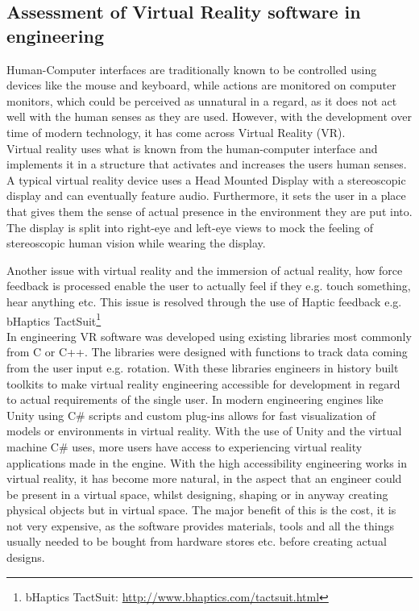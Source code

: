 \subsection{Assessment of Virtual Reality software in engineering}
Human-Computer interfaces are traditionally known to be controlled using devices like the mouse and keyboard, while actions are monitored on computer monitors, which could be perceived as unnatural in a regard, as it does not act well with the human senses as they are used. However, with the development over time of modern technology, it has come across Virtual Reality (VR). \\

Virtual reality uses what is known from the human-computer interface and implements it in a structure that activates and increases the users human senses. A typical virtual reality device uses a Head Mounted Display with a stereoscopic display and can eventually feature audio. Furthermore, it sets the user in a place that gives them the sense of actual presence in the environment they are put into. The display is split into right-eye and left-eye views to mock the feeling of stereoscopic human vision while wearing the display. 

Another issue with virtual reality and the immersion of actual reality, how force feedback is processed enable the user to actually feel if they e.g. touch something, hear anything etc. This issue is resolved through the use of Haptic feedback e.g. bHaptics TactSuit\footnote{bHaptics TactSuit: \url{http://www.bhaptics.com/tactsuit.html}} \\

In engineering VR software was developed using existing libraries most commonly from C or C++. The libraries were designed with functions to track data coming from the user input e.g. rotation. With these libraries engineers in history built toolkits to make virtual reality engineering accessible for development in regard to actual requirements of the single user. \cite{engineeringVR}
In modern engineering engines like Unity using C\# scripts and custom plug-ins allows for fast visualization of models or environments in virtual reality. With the use of Unity and the virtual machine C\# uses, more users have access to experiencing virtual reality applications made in the engine. With the high accessibility engineering works in virtual reality, it has become more natural, in the aspect that an engineer could be present in a virtual space, whilst designing, shaping or in anyway creating physical objects but in virtual space. The major benefit of this is the cost, it is not very expensive, as the software provides materials, tools and all the things usually needed to be bought from hardware stores etc. before creating actual designs. \\ 

